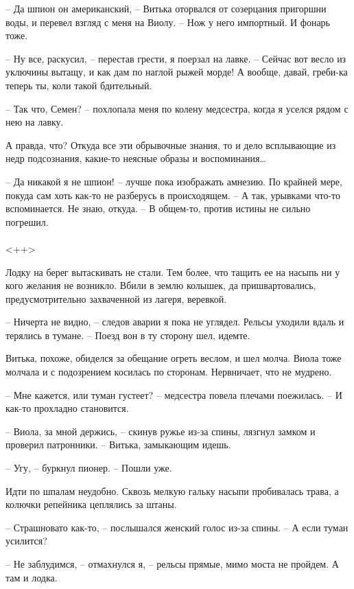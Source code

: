\documentclass[a4paper]{book}
\begin{document}
-- Да шпион он американский, -- Витька оторвался от созерцания пригоршни воды, и перевел взгляд с меня на Виолу. -- Нож у него импортный. И фонарь тоже. 

-- Ну все, раскусил, -- перестав грести, я поерзал на лавке. -- Сейчас вот весло из уключины вытащу, и как дам по наглой рыжей морде! А вообще, давай, греби-ка теперь ты, коли такой бдительный.

-- Так  что, Семен? -- похлопала меня по колену медсестра, когда я уселся рядом с нею на лавку. 

А правда, что? Откуда все эти обрывочные знания, то и дело всплывающие из недр подсознания, какие-то неясные образы и воспоминания\ldots

-- Да никакой я не шпион! -- лучше пока изображать амнезию. По крайней мере, покуда сам хоть как-то не разберусь в происходящем. -- А так, урывками что-то вспоминается. Не знаю, откуда. -- В общем-то, против истины не сильно погрешил.

\paragraph{}<++>

Лодку на берег вытаскивать не стали. Тем более, что тащить ее на насыпь ни у кого желания не возникло. Вбили в землю колышек, да пришвартовались, предусмотрительно захваченной из лагеря, веревкой.

-- Ничерта не видно, -- следов аварии я пока не углядел. Рельсы уходили вдаль и терялись в тумане. -- Поезд вон в ту сторону шел, идемте.

Витька, похоже, обиделся за обещание огреть веслом, и шел молча. Виола тоже молчала и с подозрением косилась по сторонам. Нервничает, что не мудрено.  

-- Мне кажется, или туман густеет? -- медсестра повела плечами поежилась. -- И как-то прохладно становится.

-- Виола, за мной держись, -- скинув ружье из-за спины, лязгнул замком и проверил патронники. -- Витька, замыкающим идешь. 

-- Угу, -- буркнул пионер. -- Пошли уже.

Идти по шпалам неудобно. Сквозь мелкую гальку насыпи пробивалась трава, а колючки репейника цеплялись за штаны. 

-- Страшновато как-то, -- послышался женский голос из-за спины. -- А если туман усилится?

-- Не заблудимся, -- отмахнулся я, -- рельсы прямые, мимо моста не пройдем. А там и лодка. 
\end{document}
